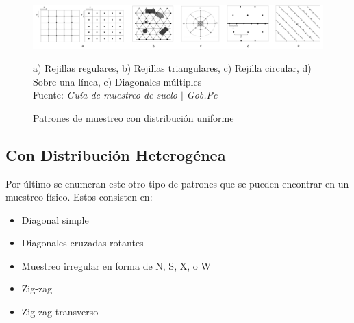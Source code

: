 \begin{figure}[H]
    \centering
    \includegraphics[width=0.7\paperwidth]{ref/uniform-sampling-patterns.png}
    \caption{Patrones de muestreo con distribución uniforme}
    a) Rejillas regulares, b) Rejillas triangulares, c) Rejilla circular, d) Sobre una línea, e) Diagonales múltiples \\
    Fuente: \textit{Guía de muestreo de suelo $\mid$ Gob.Pe} \cite{gobpe-ministerio-del-ambiente-2014}
\end{figure}


\subsection{Con Distribución Heterogénea}

Por último se enumeran este otro tipo de patrones que se pueden encontrar en un muestreo físico. Estos consisten en:

\begin{itemize}
    \item Diagonal simple
    \item Diagonales cruzadas rotantes
    \item Muestreo irregular en forma de N, S, X, o W
    \item Zig-zag
    \item Zig-zag transverso
\end{itemize}
